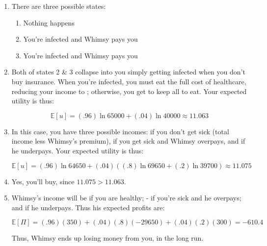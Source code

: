 \documentclass{article}
\newenvironment{solution}{\color{red}}{\color{black}}
\begin{document}
\begin{solution}
\begin{enumerate}
\item There are three possible states:
\begin{enumerate}
\item Nothing happens
\item You're infected and Whimsy pays you 
\item You're infected and Whimsy pays you 
\end{enumerate}

\item Both of states 2 \& 3 collapse into you simply getting infected when you don't buy insurance. When you're infected, you must eat the full cost of healthcare, reducing your income to ; otherwise, you get to keep all  to eat. Your expected utility is thus:

\[ \mathbb{E}\left[u \right] = (.96)\ln 65000 + (.04) \ln 40000 \approx 11.063 \]

\item In this case, you have three possible incomes:  if you don't get sick (total income less Whimsy's premium),  if you get sick and Whimsy overpays, and  if he underpays. Your expected utility is thus:

\[ \mathbb{E}[u] = (.96) \ln 64650 + (.04)\left((.8) \ln 69650 + (.2) \ln 39700 \right) \approx 11.075 \]

\item Yes, you'll buy, since $11.075 > 11.063$.

\item Whimsy's income will be  if you are healthy; -  if you're sick and he overpays; and  if he underpays. Thus his expected profits are:

\[ \mathbb{E}[\Pi] = (.96)(350) + (.04)(.8)(-29650) + (.04)(.2)(300) = -610.4 \]

Thus, Whimsy ends up losing money from you, in the long run.
\end{enumerate}
\end{solution}
\end{document}
